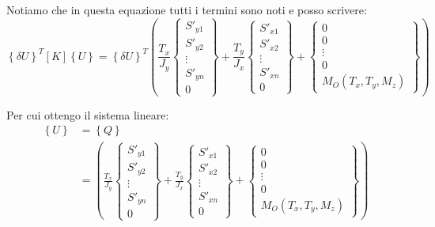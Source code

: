 Notiamo che in questa equazione tutti i termini sono noti e posso scrivere:
\begin{equation*}
    \left\{\delta U\right\}^T    [K]\left\{U\right\}= \left\{\delta U\right\}^T   \left(   
    \frac{T_x}{J_y}\left\{
    \begin{array}{c}
    S'_{y1} \\
    S'_{y2} \\
    \vdots \\
    S'_{yn}\\0
    \end{array}
    \right\}
    + \frac{T_y}{J_x}\left\{
    \begin{array}{c}
    S'_{x1} \\
    S'_{x2} \\
    \vdots \\
    S'_{xn}\\0
    \end{array}
    \right\}
    +\left\{
    \begin{array}{c}
    0 \\
    0 \\
    \vdots \\0\\
    M_O(T_x,T_y,M_z)
    \end{array}
    \right\}
    \right)
\end{equation*}

Per cui ottengo il sistema lineare:
\begin{align*}
     [K]\left\{U\right\}&= \left\{Q\right\}\\
     &=  \left(   
    \frac{T_x}{J_y}\left\{
    \begin{array}{c}
    S'_{y1} \\
    S'_{y2} \\
    \vdots \\
    S'_{yn}\\0
    \end{array}
    \right\}
    + \frac{T_y}{J_x}\left\{
    \begin{array}{c}
    S'_{x1} \\
    S'_{x2} \\
    \vdots \\
    S'_{xn}\\0
    \end{array}
    \right\}
    +\left\{
    \begin{array}{c}
    0 \\
    0 \\
    \vdots \\0\\
    M_O(T_x,T_y,M_z)
    \end{array}
    \right\}
    \right)     
\end{align*}

